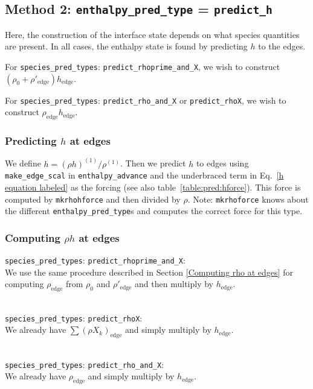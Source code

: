 \subsection{Method 2: {\tt enthalpy\_pred\_type} = {\tt predict\_h}}

Here, the construction of the interface state depends on what species 
quantities are present.  In all cases, the enthalpy state is found
by predicting $h$ to the edges.


For {\tt species\_pred\_types}: {\tt predict\_rhoprime\_and\_X}, we wish to construct 
$(\rho_0 + \rho'_\mathrm{edge} ) h_\mathrm{edge}$.

For {\tt species\_pred\_types}: {\tt predict\_rho\_and\_X} or
{\tt predict\_rhoX}, we wish to construct $\rho_\mathrm{edge} h_\mathrm{edge}$.

\subsubsection{Predicting $h$ at edges}

We define $h = (\rho h)^{(1)}/\rho^{(1)}$.  Then we predict $h$ to edges
using {\tt make\_edge\_scal} in {\tt enthalpy\_advance} and the
underbraced term in Eq.~\ref{h equation labeled} as the forcing (see
also table~\ref{table:pred:hforce}).  This force is computed by
{\tt mkrhohforce} and then divided by $\rho$.  Note: {\tt mkrhoforce}
knows about the different {\tt enthalpy\_pred\_type}s and computes
the correct force for this type.

\subsubsection{Computing $\rho h$ at edges}

{\tt species\_pred\_types}: {\tt predict\_rhoprime\_and\_X}:\\[1mm]
%
We use the same procedure described in Section \ref{Computing rho at
  edges} for computing $\rho_\mathrm{edge}$ from $\rho_0$ and
$\rho'_\mathrm{edge}$ and then multiply by $h_\mathrm{edge}$.

\ \\
{\tt species\_pred\_types}: {\tt predict\_rhoX}:\\[1mm]
%
We already have $\sum(\rho X_k)_\mathrm{edge}$ and simply multiply by
$h_\mathrm{edge}$.

\ \\
{\tt species\_pred\_types}: {\tt predict\_rho\_and\_X}:\\[1mm]
%
We already have $\rho_\mathrm{edge}$ and simply multiply by
$h_\mathrm{edge}$.



